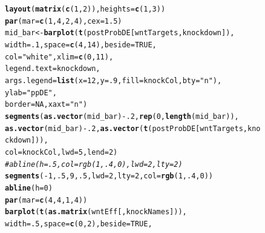 \documentclass[a4paper]{article}
\makeatletter
\newcommand{\hlnum}[1]{\textcolor[rgb]{0.686,0.059,0.569}{#1}}%
\newcommand{\hlstr}[1]{\textcolor[rgb]{0.192,0.494,0.8}{#1}}%
\newcommand{\hlcom}[1]{\textcolor[rgb]{0.678,0.584,0.686}{\textit{#1}}}%
\newcommand{\hlopt}[1]{\textcolor[rgb]{0,0,0}{#1}}%
\newcommand{\hlstd}[1]{\textcolor[rgb]{0.345,0.345,0.345}{#1}}%
\newcommand{\hlkwb}[1]{\textcolor[rgb]{0.69,0.353,0.396}{#1}}%
\newcommand{\hlkwc}[1]{\textcolor[rgb]{0.333,0.667,0.333}{#1}}%
\newcommand{\hlkwd}[1]{\textcolor[rgb]{0.737,0.353,0.396}{\textbf{#1}}}%
\newenvironment{kframe}{%
 \def\at@end@of@kframe{}%
 \ifinner\ifhmode%
  \def\at@end@of@kframe{\end{minipage}}%
  \begin{minipage}{\columnwidth}%
 \fi\fi%
 \def\FrameCommand##1{\hskip\@totalleftmargin \hskip-\fboxsep
 \colorbox{shadecolor}{##1}\hskip-\fboxsep
     \hskip-\linewidth \hskip-\@totalleftmargin \hskip\columnwidth}%
 \MakeFramed {\advance\hsize-\width
   \@totalleftmargin\z@ \linewidth\hsize
   \@setminipage}}%
 {\par\unskip\endMakeFramed%
 \at@end@of@kframe}
\newenvironment{knitrout}{}{} %
\makeatother
\begin{document}
\begin{figure}[htbp]
\begin{center}
\begin{knitrout}
\color{fgcolor}\begin{kframe}
\begin{alltt}
\hlkwd{layout}\hlstd{(}\hlkwd{matrix}\hlstd{(}\hlkwd{c}\hlstd{(}\hlnum{1}\hlstd{,}\hlnum{2}\hlstd{)),} \hlkwc{heights}\hlstd{=}\hlkwd{c}\hlstd{(}\hlnum{1}\hlstd{,}\hlnum{3}\hlstd{))}
\hlkwd{par}\hlstd{(}\hlkwc{mar} \hlstd{=} \hlkwd{c}\hlstd{(}\hlnum{1}\hlstd{,}\hlnum{4}\hlstd{,}\hlnum{2}\hlstd{,}\hlnum{4}\hlstd{),} \hlkwc{cex}\hlstd{=}\hlnum{1.5}\hlstd{)}
\hlstd{mid_bar} \hlkwb{<-} \hlkwd{barplot}\hlstd{(}\hlkwd{t}\hlstd{(postProbDE[wntTargets, knockdown]),}
        \hlkwc{width}\hlstd{=}\hlnum{.1}\hlstd{,} \hlkwc{space}\hlstd{=}\hlkwd{c}\hlstd{(}\hlnum{4}\hlstd{,}\hlnum{14}\hlstd{),} \hlkwc{beside}\hlstd{=}\hlnum{TRUE}\hlstd{,}
        \hlkwc{col}\hlstd{=}\hlstr{"white"}\hlstd{,} \hlkwc{xlim}\hlstd{=}\hlkwd{c}\hlstd{(}\hlnum{0}\hlstd{,}\hlnum{11}\hlstd{),}
        \hlkwc{legend.text}\hlstd{=knockdown,}
        \hlkwc{args.legend}\hlstd{=}\hlkwd{list}\hlstd{(}\hlkwc{x}\hlstd{=}\hlnum{12}\hlstd{,} \hlkwc{y}\hlstd{=}\hlnum{.9}\hlstd{,} \hlkwc{fill}\hlstd{=knockCol,} \hlkwc{bty}\hlstd{=}\hlstr{"n"}\hlstd{),}
        \hlkwc{ylab}\hlstd{=}\hlstr{"pp DE"}\hlstd{,}
        \hlkwc{border}\hlstd{=}\hlnum{NA}\hlstd{,} \hlkwc{xaxt}\hlstd{=}\hlstr{"n"}\hlstd{)}
\hlkwd{segments}\hlstd{(}\hlkwd{as.vector}\hlstd{(mid_bar)}\hlopt{-}\hlnum{.2}\hlstd{,} \hlkwd{rep}\hlstd{(}\hlnum{0}\hlstd{,} \hlkwd{length}\hlstd{(mid_bar)),}
         \hlkwd{as.vector}\hlstd{(mid_bar)}\hlopt{-}\hlnum{.2}\hlstd{,} \hlkwd{as.vector}\hlstd{(}\hlkwd{t}\hlstd{(postProbDE[wntTargets, knockdown])),}
         \hlkwc{col}\hlstd{=knockCol,} \hlkwc{lwd}\hlstd{=}\hlnum{5}\hlstd{,} \hlkwc{lend}\hlstd{=}\hlnum{2}\hlstd{)}
\hlcom{# abline(h=.5, col=rgb(1, .4, 0), lwd=2, lty=2)}
\hlkwd{segments}\hlstd{(}\hlopt{-}\hlnum{1}\hlstd{,} \hlnum{.5}\hlstd{,} \hlnum{9}\hlstd{,} \hlnum{.5}\hlstd{,} \hlkwc{lwd}\hlstd{=}\hlnum{2}\hlstd{,} \hlkwc{lty}\hlstd{=}\hlnum{2}\hlstd{,} \hlkwc{col}\hlstd{=}\hlkwd{rgb}\hlstd{(}\hlnum{1}\hlstd{,} \hlnum{.4}\hlstd{,} \hlnum{0}\hlstd{))}
\hlkwd{abline}\hlstd{(}\hlkwc{h}\hlstd{=}\hlnum{0}\hlstd{)}
\hlkwd{par}\hlstd{(}\hlkwc{mar} \hlstd{=} \hlkwd{c}\hlstd{(}\hlnum{4}\hlstd{,}\hlnum{4}\hlstd{,}\hlnum{1}\hlstd{,}\hlnum{4}\hlstd{))}
\hlkwd{barplot}\hlstd{(}\hlkwd{t}\hlstd{(}\hlkwd{as.matrix}\hlstd{(wntEff[,knockNames])),}
        \hlkwc{width}\hlstd{=}\hlnum{.5}\hlstd{,} \hlkwc{space}\hlstd{=}\hlkwd{c}\hlstd{(}\hlnum{0}\hlstd{,}\hlnum{2}\hlstd{),} \hlkwc{beside}\hlstd{=}\hlnum{TRUE}\hlstd{,}

\end{alltt}
\end{kframe}
\end{knitrout}
\end{center}
\end{figure}
\end{document}
